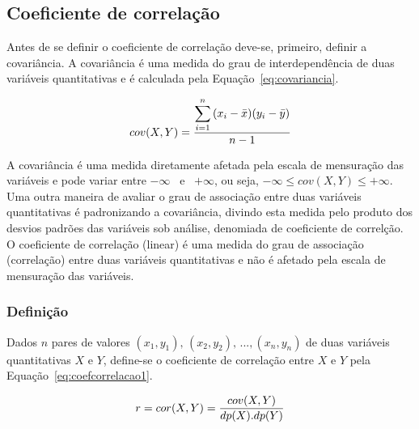 \documentclass[11pt,fleqn]{book} %
\begin{document}
\subsection{Coeficiente de correlação}

Antes de se definir o coeficiente de correlação deve-se, primeiro, definir a covariância. A covariância é uma medida do grau de interdependência de duas variáveis quantitativas e é calculada pela Equação~\ref{eq:covariancia}. \\

\begin{eBox}
\vspace{-0.5cm}
\begin{equation} \label{eq:covariancia}
\displaystyle cov(X,Y)=\frac{\displaystyle \sum_{i=1}^{n}{(x_i-\bar{x})(y_i-\bar{y})}}{n-1} \\
\end{equation}
\end{eBox}

\vspace{0,2cm}
A covariância é uma medida diretamente afetada pela escala de mensuração das variáveis e pode variar entre $-\infty$ \, e \, $+\infty$, ou seja, $-\infty \leq cov(X,Y) \leq +\infty$. \\

Uma outra maneira de avaliar o grau de associação entre duas variáveis quantitativas é padronizando a covariância, divindo esta medida pelo produto dos desvios padrões das variáveis sob análise, denomiada de coeficiente de correlção. O coeficiente de correlação (linear) é uma medida do grau de associação (correlação) entre duas variáveis quantitativas e não é afetado pela escala de mensuração das variáveis. \\

\subsubsection{Definição}
Dados $n$ pares de valores $(x_1, y_1), \, (x_2, y_2), \, ..., (x_n, y_n)$ de duas variáveis quantitativas $X$ e $Y$, define-se o coeficiente de correlação entre $X$ e $Y$ pela Equação~\ref{eq:coefcorrelacao1}. \\

\begin{eBox}
\vspace{-0.5cm}
\begin{equation} \label{eq:coefcorrelacao1}
\displaystyle r=cor(X,Y)=\frac{cov(X,Y)}{dp(X).dp(Y)} \\
\end{equation}
\end{eBox}
\end{document}
